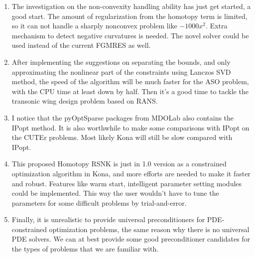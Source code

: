 \begin{enumerate}
\item The investigation on the non-convexity handling ability has just get started, a good start. 
The amount of regularization from the homotopy term is limited, so it can not handle a sharply 
nonconvex problem like $-1000x^2$.  Extra mechanism to detect negative curvatures is needed. 
The novel solver \cite{hicken:flecs2014} could be used instead of the current FGMRES as well. 

\item After implementing the suggestions on separating the bounds, and only approximating the 
nonlinear part of the constraints using Lanczos SVD method, the speed of the algorithm will be 
much faster for the ASO problem, with the CPU time at least down by half. Then it's a good time to 
tackle the transonic wing design problem based on RANS. 

\item I notice that the pyOptSparse packages from MDOLab also contains the IPopt method. It is also 
worthwhile to make some comparisons with IPopt on the CUTEr problems. Most likely Kona will 
still be slow compared with IPopt. 

\item This proposed Homotopy RSNK is just in 1.0 version as a constrained optimization algorithm 
in Kona, and more efforts are needed to make it faster and robust. Features like warm start, 
intelligent parameter setting modules could be implemented. This way the user wouldn't have to 
tune the parameters for some difficult problems by trial-and-error.  

\item Finally, it is unrealistic to provide universal preconditioners for PDE-constrained optimization 
problems, the same reason why there is no universal PDE solvers. We can at best provide some good 
preconditioner candidates for the types of problems that we are familiar with. 

\end{enumerate}




